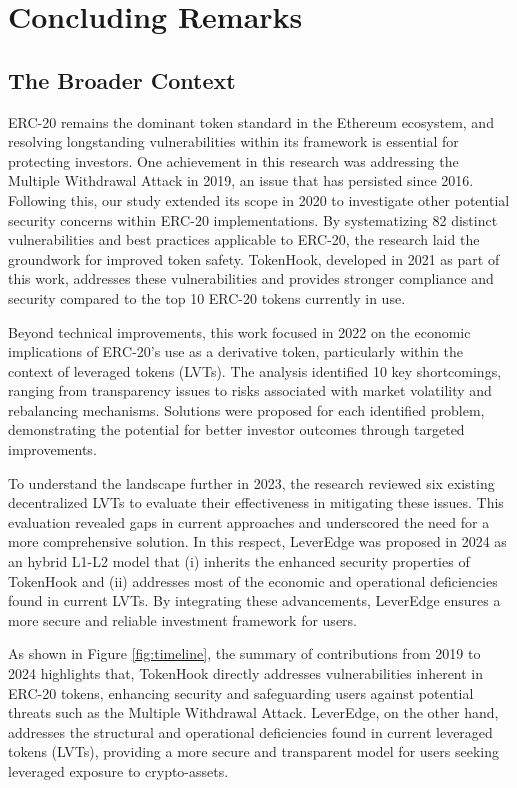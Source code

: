 
\chapter{Concluding Remarks}\label{ch:remarks}

\section{The Broader Context}
ERC-20 remains the dominant token standard in the Ethereum ecosystem, and resolving longstanding vulnerabilities within its framework is essential for protecting investors. One achievement in this research was addressing the Multiple Withdrawal Attack in 2019, an issue that has persisted since 2016. Following this, our study extended its scope in 2020 to investigate other potential security concerns within ERC-20 implementations. By systematizing 82 distinct vulnerabilities and best practices applicable to ERC-20, the research laid the groundwork for improved token safety. TokenHook, developed in 2021 as part of this work, addresses these vulnerabilities and provides stronger compliance and security compared to the top 10 ERC-20 tokens currently in use.

Beyond technical improvements, this work focused in 2022 on the economic implications of ERC-20's use as a derivative token, particularly within the context of leveraged tokens (LVTs). The analysis identified 10 key shortcomings, ranging from transparency issues to risks associated with market volatility and rebalancing mechanisms. Solutions were proposed for each identified problem, demonstrating the potential for better investor outcomes through targeted improvements.

To understand the landscape further in 2023, the research reviewed six existing decentralized LVTs to evaluate their effectiveness in mitigating these issues. This evaluation revealed gaps in current approaches and underscored the need for a more comprehensive solution. In this respect, LeverEdge was proposed in 2024 as an hybrid L1-L2 model that (i) inherits the enhanced security properties of TokenHook and (ii) addresses most of the economic and operational deficiencies found in current LVTs. By integrating these advancements, LeverEdge ensures a more secure and reliable investment framework for users.

As shown in Figure \ref{fig:timeline}, the summary of contributions from 2019 to 2024 highlights that, TokenHook directly addresses vulnerabilities inherent in ERC-20 tokens, enhancing security and safeguarding users against potential threats such as the Multiple Withdrawal Attack. LeverEdge, on the other hand, addresses the structural and operational deficiencies found in current leveraged tokens (LVTs), providing a more secure and transparent model for users seeking leveraged exposure to crypto-assets.

